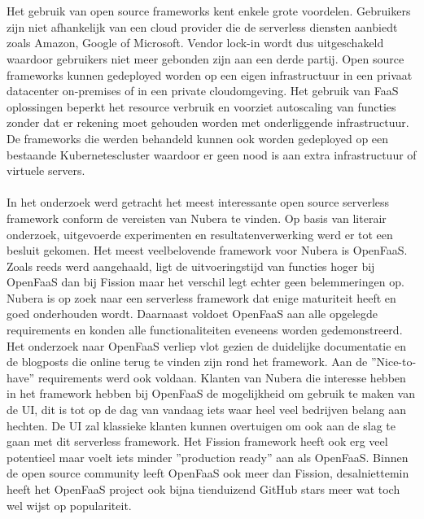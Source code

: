 \\\\
Het gebruik van open source frameworks kent enkele grote voordelen. Gebruikers zijn niet afhankelijk van een cloud provider die de serverless diensten aanbiedt zoals Amazon, Google of Microsoft. Vendor lock-in wordt dus uitgeschakeld waardoor gebruikers niet meer gebonden zijn aan een derde partij. Open source frameworks kunnen gedeployed worden op een eigen infrastructuur in een privaat datacenter on-premises of in een private cloudomgeving. Het gebruik van FaaS oplossingen beperkt het resource verbruik en voorziet autoscaling van functies zonder dat er rekening moet gehouden worden met onderliggende infrastructuur. De frameworks die werden behandeld kunnen ook worden gedeployed op een bestaande Kubernetescluster waardoor er geen nood is aan extra infrastructuur of virtuele servers.
\\\\
In het onderzoek werd getracht het meest interessante open source serverless framework conform de vereisten van Nubera te vinden. Op basis van literair onderzoek, uitgevoerde experimenten en resultatenverwerking werd er tot een besluit gekomen. Het meest veelbelovende framework voor Nubera is OpenFaaS. Zoals reeds werd aangehaald, ligt de uitvoeringstijd van functies hoger bij OpenFaaS dan bij Fission maar het verschil legt echter geen belemmeringen op. Nubera is op zoek naar een serverless framework dat enige maturiteit heeft en goed onderhouden wordt. Daarnaast voldoet OpenFaaS aan alle opgelegde requirements en konden alle functionaliteiten eveneens worden gedemonstreerd. Het onderzoek naar OpenFaaS verliep vlot gezien de duidelijke documentatie en de blogposts die online terug te vinden zijn rond het framework. Aan de ''Nice-to-have'' requirements werd ook voldaan. Klanten van Nubera die interesse hebben in het framework hebben bij OpenFaaS de mogelijkheid om gebruik te maken van de UI, dit is tot op de dag van vandaag iets waar heel veel bedrijven belang aan hechten. De UI zal klassieke klanten kunnen overtuigen om ook aan de slag te gaan met dit serverless framework. Het Fission framework heeft ook erg veel potentieel maar voelt iets minder ''production ready'' aan als OpenFaaS. Binnen de open source community leeft OpenFaaS ook meer dan Fission, desalniettemin heeft het OpenFaaS project ook bijna tienduizend GitHub stars meer wat toch wel wijst op populariteit.
\\\\
